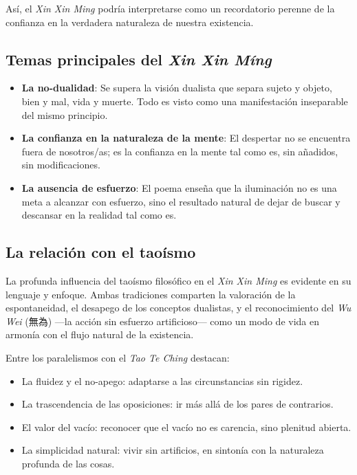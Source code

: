 \documentclass[
  a5paperpaper,
]{article}
\providecommand{\tightlist}{%
  \setlength{\itemsep}{0pt}\setlength{\parskip}{0pt}}
\begin{document}
Así, el \emph{Xin Xin Ming} podría interpretarse como un recordatorio
perenne de la confianza en la verdadera naturaleza de nuestra
existencia.

\hypertarget{temas-principales-del-xin-xin-muxedng}{%
\subsection{\texorpdfstring{Temas principales del \emph{Xin Xin
Míng}}{Temas principales del Xin Xin Míng}}\label{temas-principales-del-xin-xin-muxedng}}

\begin{itemize}
\tightlist
\item
  \textbf{La no-dualidad}: Se supera la visión dualista que separa
  sujeto y objeto, bien y mal, vida y muerte. Todo es visto como una
  manifestación inseparable del mismo principio.
\item
  \textbf{La confianza en la naturaleza de la mente}: El despertar no se
  encuentra fuera de nosotros/as; es la confianza en la mente tal como
  es, sin añadidos, sin modificaciones.
\item
  \textbf{La ausencia de esfuerzo}: El poema enseña que la iluminación
  no es una meta a alcanzar con esfuerzo, sino el resultado natural de
  dejar de buscar y descansar en la realidad tal como es.
\end{itemize}

\hypertarget{la-relaciuxf3n-con-el-taouxedsmo}{%
\subsection{La relación con el
taoísmo}\label{la-relaciuxf3n-con-el-taouxedsmo}}

La profunda influencia del taoísmo filosófico en el \emph{Xin Xin Ming}
es evidente en su lenguaje y enfoque. Ambas tradiciones comparten la
valoración de la espontaneidad, el desapego de los conceptos dualistas,
y el reconocimiento del \emph{Wu Wei} (無為) ---la acción sin esfuerzo
artificioso--- como un modo de vida en armonía con el flujo natural de
la existencia.

Entre los paralelismos con el \emph{Tao Te Ching} destacan:

\begin{itemize}
\tightlist
\item
  La fluidez y el no-apego: adaptarse a las circunstancias sin rigidez.
\item
  La trascendencia de las oposiciones: ir más allá de los pares de
  contrarios.
\item
  El valor del vacío: reconocer que el vacío no es carencia, sino
  plenitud abierta.
\item
  La simplicidad natural: vivir sin artificios, en sintonía con la
  naturaleza profunda de las cosas.
\end{itemize}
\end{document}
